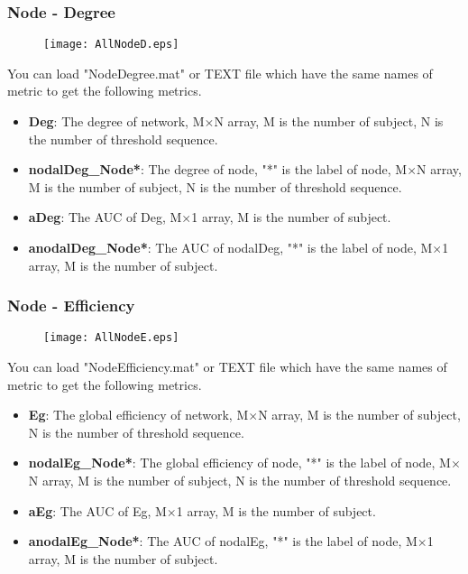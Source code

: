 \documentclass[11pt]{article}
\begin{document}
			\subsubsection{Node - Degree}
				\begin{figure}
					\begin{center}
						\texttt{[image: AllNodeD.eps]}
					\end{center}
				\end{figure}
				You can load "NodeDegree.mat" or TEXT file which have the same names of metric to get the following metrics.
				\begin{itemize}
					\item \textbf{Deg}: The degree of network,
						M$\times$N array, M is the number of subject, N is the number of threshold sequence.
					\item \textbf{nodalDeg\_Node*}: The degree of node, "*" is the label of node,
						M$\times$N array, M is the number of subject, N is the number of threshold sequence.
					\item \textbf{aDeg}: The AUC of Deg,
						M$\times$1 array, M is the number of subject.
					\item \textbf{anodalDeg\_Node*}: The AUC of nodalDeg, "*" is the label of node,
						M$\times$1 array, M is the number of subject.
				\end{itemize}
			\subsubsection{Node - Efficiency}
				\begin{figure}
					\begin{center}
						\texttt{[image: AllNodeE.eps]}
					\end{center}
				\end{figure}
				You can load "NodeEfficiency.mat" or TEXT file which have the same names of metric to get the following metrics.
				\begin{itemize}
					\item \textbf{Eg}: The global efficiency of network,
						M$\times$N array, M is the number of subject, N is the number of threshold sequence.
					\item \textbf{nodalEg\_Node*}: The global efficiency of node, "*" is the label of node,
						M$\times$N array, M is the number of subject, N is the number of threshold sequence.
					\item \textbf{aEg}: The AUC of Eg,
						M$\times$1 array, M is the number of subject.
					\item \textbf{anodalEg\_Node*}: The AUC of nodalEg, "*" is the label of node,
						M$\times$1 array, M is the number of subject.
				\end{itemize}
\end{document}
